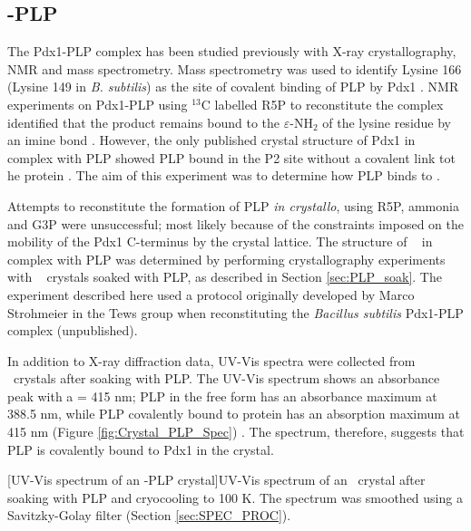 \clearpage      
\subsection{\atpdx -PLP}
The Pdx1-PLP complex has been studied previously with X-ray crystallography, NMR and mass spectrometry. Mass spectrometry was used to identify Lysine 166 (Lysine 149 in \textit{B. subtilis}) as the site of covalent binding of PLP by Pdx1 \cite{Moccand2011}. NMR experiments on Pdx1-PLP using $^{13}$C labelled R5P to reconstitute the complex identified that the product remains bound to the $\varepsilon$-NH$_2$ of the lysine residue by an imine bond \cite{Hanes2008b}. However, the only published crystal structure of Pdx1 in complex with PLP showed PLP bound in the P2 site without a covalent link tot he protein \cite{Zhang2010}. The aim of this experiment was to determine how PLP binds to \atpdx .


Attempts to reconstitute the formation of PLP \textit{in crystallo}, using R5P, ammonia and G3P were unsuccessful; most likely because of the constraints imposed on the mobility of the Pdx1 C-terminus by the crystal lattice. The structure of \atpdx~ in complex with PLP was determined by performing crystallography experiments with \atpdx~ crystals soaked with PLP, as described in Section \ref{sec:PLP_soak}. The experiment described here used a protocol originally developed by Marco Strohmeier in the Tews group when reconstituting the \textit{Bacillus subtilis} Pdx1-PLP complex (unpublished). 

In addition to X-ray diffraction data, UV-Vis spectra were collected from \atpdx ~crystals after soaking with PLP. The UV-Vis spectrum shows an absorbance peak with a \lwl = 415 nm; PLP in the free form has an absorbance maximum at 388.5 nm, while PLP covalently bound to protein has an absorption maximum at 415 nm (Figure \ref{fig:Crystal_PLP_Spec}) \cite{Hanes2008b}. The spectrum, therefore, suggests that PLP is covalently bound to Pdx1 in the crystal.   

\begin{minipage}{\linewidth}
	[UV-Vis spectrum of an \atpdx -PLP crystal]{UV-Vis spectrum of an \atpdx ~crystal after soaking with PLP and cryocooling to 100 K. The spectrum was smoothed using a Savitzky-Golay filter (Section \ref{sec:SPEC_PROC}).\label{fig:Crystal_PLP_Spec}}		
\end{minipage}

